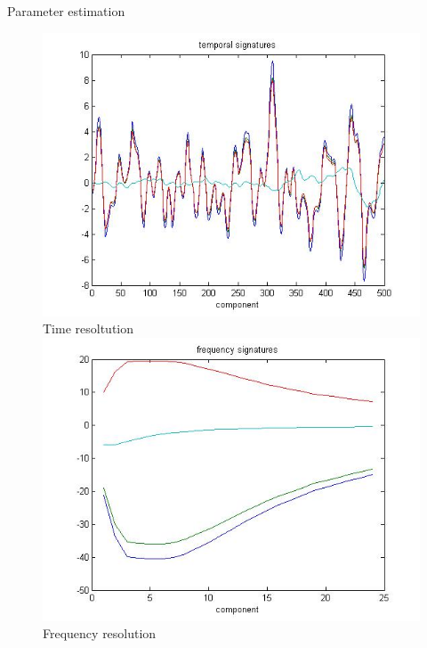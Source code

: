 \documentclass[t,12pt,english
\ifx\beamermode\undefined\else,\beamermode\fi
]{beamer}
\begin{document}
\begin{frame}{Parameter estimation}
 
 \begin{figure}[!htbp]
%
\centering
\includegraphics[width=1\textwidth]{18.jpg}\\
\tiny{Time resoltution}\label{a18}
\endminipage\hfill
{}%
\centering
\includegraphics[width=1\textwidth]{19.jpg}\\
\tiny{Frequency resolution}\label{a19}
\endminipage\hfill
\end{figure}

\end{frame}
\end{document}

